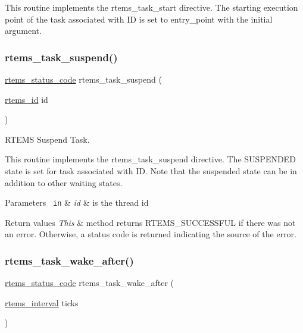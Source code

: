 This routine implements the rtems\+\_\+task\+\_\+start directive. The starting execution point of the task associated with ID is set to entry\+\_\+point with the initial argument. \mbox{\label{group__ClassicTasks_ga16aca2f5aa37d9d2b2a1a54de0f63dbf}} 
\subsubsection{\texorpdfstring{rtems\_task\_suspend()}{rtems\_task\_suspend()}}
{\footnotesize\ttfamily \mbox{\hyperlink{group__ClassicStatus_ga545d41846817eaba6143d52ee4d9e9fe}{rtems\+\_\+status\+\_\+code}} rtems\+\_\+task\+\_\+suspend (\begin{DoxyParamCaption}\item[{\mbox{\hyperlink{group__ClassicTasks_gab20892b814dced7dd4e5b9bf42becd57}{rtems\+\_\+id}}}]{id }\end{DoxyParamCaption})}



R\+T\+E\+MS Suspend Task. 

This routine implements the rtems\+\_\+task\+\_\+suspend directive. The S\+U\+S\+P\+E\+N\+D\+ED state is set for task associated with ID. Note that the suspended state can be in addition to other waiting states.


\begin{DoxyParams}[1]{Parameters}
\mbox{\texttt{ in}}  & {\em id} & is the thread id\\
\hline
\end{DoxyParams}

\begin{DoxyRetVals}{Return values}
{\em This} & method returns R\+T\+E\+M\+S\+\_\+\+S\+U\+C\+C\+E\+S\+S\+F\+UL if there was not an error. Otherwise, a status code is returned indicating the source of the error. \\
\hline
\end{DoxyRetVals}
\mbox{\label{group__ClassicTasks_ga69becc1811a7654b0b74836272ac6429}} 
\subsubsection{\texorpdfstring{rtems\_task\_wake\_after()}{rtems\_task\_wake\_after()}}
{\footnotesize\ttfamily \mbox{\hyperlink{group__ClassicStatus_ga545d41846817eaba6143d52ee4d9e9fe}{rtems\+\_\+status\+\_\+code}} rtems\+\_\+task\+\_\+wake\+\_\+after (\begin{DoxyParamCaption}\item[{\mbox{\hyperlink{group__ClassicTasks_gad39c43f949683d46874e3a5586b93aee}{rtems\+\_\+interval}}}]{ticks }\end{DoxyParamCaption})}



